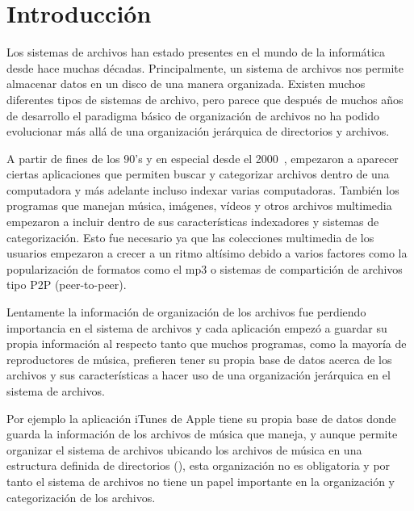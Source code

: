 \chapter{Introducción}
\ifpdf
    \graphicspath{{Introduction/IntroductionFigs/PNG/}{Introduction/IntroductionFigs/PDF/}{Introduction/IntroductionFigs/}}
\else
    \graphicspath{{Introduction/IntroductionFigs/EPS/}{Introduction/IntroductionFigs/}}
\fi

Los sistemas de archivos han estado presentes en el mundo de la informática desde hace muchas décadas. Principalmente, un sistema de archivos nos permite almacenar datos en un disco de una manera organizada. Existen muchos diferentes tipos de sistemas de archivo, pero parece que después de muchos años de desarrollo el paradigma básico de organización de archivos no ha podido evolucionar más allá de una organización jerárquica de directorios y archivos.

A partir de fines de los 90's y en especial desde el 2000~\cite{filesystem:wikipedia}, empezaron a aparecer ciertas aplicaciones que permiten buscar y categorizar archivos dentro de una computadora y más adelante incluso indexar varias computadoras. También los programas que manejan música, imágenes, vídeos y otros archivos multimedia empezaron a incluir dentro de sus características indexadores y sistemas de categorización. Esto fue necesario ya que las colecciones multimedia de los usuarios empezaron a crecer a un ritmo altísimo debido a varios factores como la popularización de formatos como el mp3 o sistemas de compartición de archivos tipo P2P (peer-to-peer).

Lentamente la información de organización de los archivos fue perdiendo importancia en el sistema de archivos y cada aplicación empezó a guardar su propia información al respecto tanto que muchos programas, como la mayoría de reproductores de música, prefieren tener su propia base de datos acerca de los archivos y sus características a hacer uso de una organización jerárquica en el sistema de archivos.

Por ejemplo la aplicación iTunes de Apple tiene su propia base de datos donde guarda la información de los archivos de música que maneja, y aunque permite organizar el sistema de archivos ubicando los archivos de música en una estructura definida de directorios (), esta organización no es obligatoria y por tanto el sistema de archivos no tiene un papel importante en la organización y categorización de los archivos.

